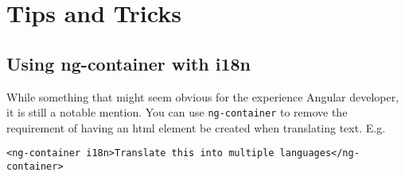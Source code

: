 \section{Tips and Tricks}
\subsection{Using ng-container with i18n}
While something that might seem obvious for the experience Angular developer, 
it is still a notable mention. You can use \lstinline{ng-container} to remove
the requirement of having an html element be created when translating text. 
E.g.
\begin{lstlisting}
<ng-container i18n>Translate this into multiple languages</ng-container>
\end{lstlisting}
